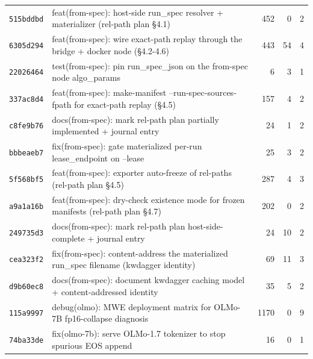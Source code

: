 \begin{longtable}{@{}p{}p{}r r r@{}}
\texttt{515bddbd} & feat(from-spec): host-side run\_spec resolver + materializer (rel-path plan §4.1) & 452 & 0 & 2 \\
\texttt{6305d294} & feat(from-spec): wire exact-path replay through the bridge + docker node (§4.2-4.6) & 443 & 54 & 4 \\
\texttt{22026464} & test(from-spec): pin run\_spec\_json on the from-spec node algo\_params & 6 & 3 & 1 \\
\texttt{337ac8d4} & feat(from-spec): make-manifest --run-spec-sources-fpath for exact-path replay (§4.5) & 157 & 4 & 2 \\
\texttt{c8fe9b76} & docs(from-spec): mark rel-path plan partially implemented + journal entry & 24 & 1 & 2 \\
\texttt{bbbeaeb7} & fix(from-spec): gate materialized per-run lease\_endpoint on --lease & 25 & 3 & 2 \\
\texttt{5f568bf5} & feat(from-spec): exporter auto-freeze of rel-paths (rel-path plan §4.5) & 287 & 4 & 3 \\
\texttt{a9a1a16b} & feat(from-spec): dry-check existence mode for frozen manifests (rel-path plan §4.7) & 202 & 0 & 2 \\
\texttt{249735d3} & docs(from-spec): mark rel-path plan host-side-complete + journal entry & 24 & 10 & 2 \\
\texttt{cea323f2} & fix(from-spec): content-address the materialized run\_spec filename (kwdagger identity) & 69 & 11 & 3 \\
\texttt{d9b60ec8} & docs(from-spec): document kwdagger caching model + content-addressed identity & 35 & 5 & 2 \\
\texttt{115a9997} & debug(olmo): MWE deployment matrix for OLMo-7B fp16-collapse diagnosis & 1170 & 0 & 9 \\
\texttt{74ba33de} & fix(olmo-7b): serve OLMo-1.7 tokenizer to stop spurious EOS append & 16 & 0 & 1 \\
\bottomrule\end{longtable}
